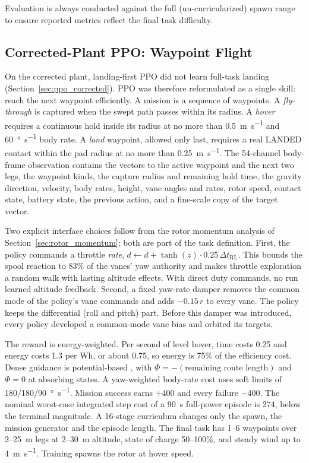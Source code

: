 \documentclass[conference]{IEEEtran}
\begin{document}
Evaluation is always conducted against the full (un-curricularized) spawn range to ensure reported metrics reflect the final task difficulty.

\subsection{Corrected-Plant PPO: Waypoint Flight}
\label{sec:ppo_waypoint}

On the corrected plant, landing-first PPO did not learn full-task landing (Section~\ref{sec:ppo_corrected}). PPO was therefore reformulated as a single skill: reach the next waypoint efficiently. A mission is a sequence of waypoints. A \emph{fly-through} is captured when the swept path passes within its radius. A \emph{hover} requires a continuous hold inside its radius at no more than \SI{0.5}{\metre\per\second} and \SI{60}{\degree\per\second} body rate. A \emph{land} waypoint, allowed only last, requires a real LANDED contact within the pad radius at no more than \SI{0.25}{\metre\per\second}. The 54-channel body-frame observation contains the vectors to the active waypoint and the next two legs, the waypoint kinds, the capture radius and remaining hold time, the gravity direction, velocity, body rates, height, vane angles and rates, rotor speed, contact state, battery state, the previous action, and a fine-scale copy of the target vector.

Two explicit interface choices follow from the rotor momentum analysis of Section~\ref{sec:rotor_momentum}; both are part of the task definition. First, the policy commands a throttle \emph{rate}, $d \leftarrow d + \tanh(z)\cdot 0.25\,\Delta t_{\text{RL}}$. This bounds the spool reaction to 83\% of the vanes' yaw authority and makes throttle exploration a random walk with lasting altitude effects. With direct duty commands, no run learned altitude feedback. Second, a fixed yaw-rate damper removes the common mode of the policy's vane commands and adds $-0.15\,r$ to every vane. The policy keeps the differential (roll and pitch) part. Before this damper was introduced, every policy developed a common-mode vane bias and orbited its targets.

The reward is energy-weighted. Per second of level hover, time costs 0.25 and energy costs 1.3 per Wh, or about 0.75, so energy is 75\% of the efficiency cost. Dense guidance is potential-based \cite{b27}, with $\Phi = -(\text{remaining route length})$ and $\Phi = 0$ at absorbing states. A yaw-weighted body-rate cost uses soft limits of 180/180/\SI{90}{\degree\per\second}. Mission success earns $+400$ and every failure $-400$. The nominal worst-case integrated step cost of a \SI{90}{\second} full-power episode is 274, below the terminal magnitude. A 16-stage curriculum changes only the spawn, the mission generator and the episode length. The final task has 1--6 waypoints over 2--\SI{25}{\metre} legs at 2--\SI{30}{\metre} altitude, state of charge 50--100\%, and steady wind up to \SI{4}{\metre\per\second}. Training spawns the rotor at hover speed.
\end{document}
